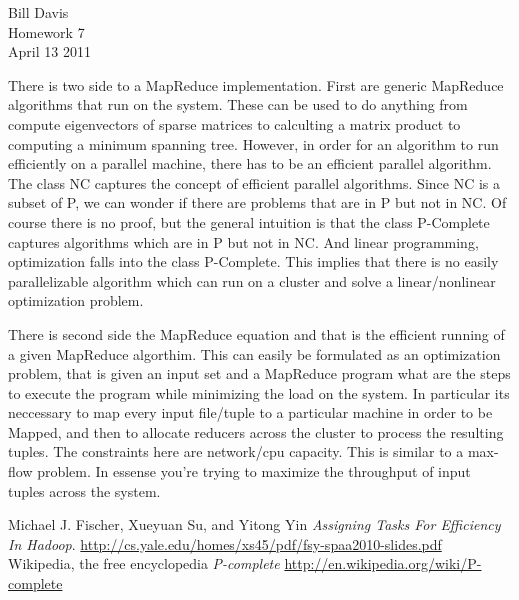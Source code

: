 \documentclass[11pt,fleqn]{article}
\begin{document}
\newcommand{\mbf}[1]{\mbox{{\bfseries #1}}}
\newcommand{\N}{\mbf{N}}
\renewcommand{\O}{\mbf{O}}

\noindent Bill Davis \\
Homework 7 \\
April 13 2011

There is two side to a MapReduce implementation. First are generic
MapReduce algorithms that run on the system. These can be used to do anything
from compute eigenvectors of sparse matrices to calculting a matrix product to
computing a minimum spanning tree. However, in order for an algorithm to run
efficiently on a parallel machine, there has to be an efficient parallel
algorithm. The class NC captures the concept of efficient parallel algorithms.
Since NC is a subset of P, we can wonder if there are problems that are in P but
not in NC. Of course there is no proof, but the general intuition is that the
class P-Complete captures algorithms which are in P but not in NC. And linear
programming, optimization falls into the class P-Complete. This implies that
there is no easily parallelizable algorithm which can run on a cluster and solve
a linear/nonlinear optimization problem. 

There is second side the MapReduce equation and that is the
efficient running of a given MapReduce algorthim. This can easily be formulated
as an optimization problem, that is given an input set and a MapReduce program
what are the steps to execute the program while minimizing the load on the
system. In particular its neccessary to map every input file/tuple to a
particular machine in order to be Mapped, and then to allocate reducers
across the cluster to process the resulting tuples. The constraints here are
network/cpu capacity. This is similar to a max-flow problem. In essense you're
trying to maximize the throughput of input tuples across the system. 

\begin{thebibliography}{9}

  Michael J. Fischer, Xueyuan Su, and Yitong Yin
  \emph{Assigning Tasks For Efficiency In Hadoop}.
  \url{http://cs.yale.edu/homes/xs45/pdf/fsy-spaa2010-slides.pdf}
	Wikipedia, the free encyclopedia
	\emph{P-complete} 
	\url{http://en.wikipedia.org/wiki/P-complete}

\end{thebibliography}
\end{document}
